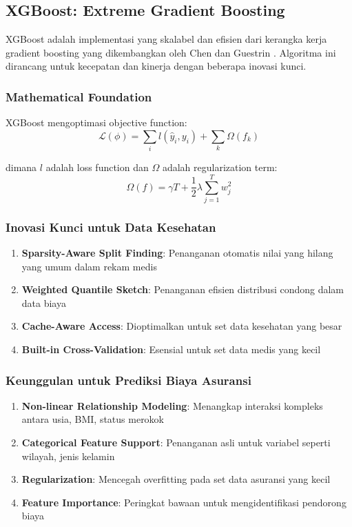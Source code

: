 \subsection{XGBoost: Extreme Gradient Boosting}
XGBoost adalah implementasi yang skalabel dan efisien dari kerangka kerja gradient boosting yang dikembangkan oleh Chen dan Guestrin \citep{Chen2016}. Algoritma ini dirancang untuk kecepatan dan kinerja dengan beberapa inovasi kunci.

\subsubsection{Mathematical Foundation}
XGBoost mengoptimasi objective function:
\begin{equation}
\mathcal{L}(\phi) = \sum_{i} l(\hat{y}_i, y_i) + \sum_{k} \Omega(f_k)
\end{equation}

dimana $l$ adalah loss function dan $\Omega$ adalah regularization term:
\begin{equation}
\Omega(f) = \gamma T + \frac{1}{2}\lambda \sum_{j=1}^{T} w_j^2
\end{equation}

\subsubsection{Inovasi Kunci untuk Data Kesehatan}
\begin{enumerate}
\item \textbf{Sparsity-Aware Split Finding}: Penanganan otomatis nilai yang hilang yang umum dalam rekam medis
\item \textbf{Weighted Quantile Sketch}: Penanganan efisien distribusi condong dalam data biaya
\item \textbf{Cache-Aware Access}: Dioptimalkan untuk set data kesehatan yang besar
\item \textbf{Built-in Cross-Validation}: Esensial untuk set data medis yang kecil
\end{enumerate}

\subsubsection{Keunggulan untuk Prediksi Biaya Asuransi}
\begin{enumerate}
\item \textbf{Non-linear Relationship Modeling}: Menangkap interaksi kompleks antara usia, BMI, status merokok
\item \textbf{Categorical Feature Support}: Penanganan asli untuk variabel seperti wilayah, jenis kelamin
\item \textbf{Regularization}: Mencegah overfitting pada set data asuransi yang kecil
\item \textbf{Feature Importance}: Peringkat bawaan untuk mengidentifikasi pendorong biaya
\end{enumerate}

